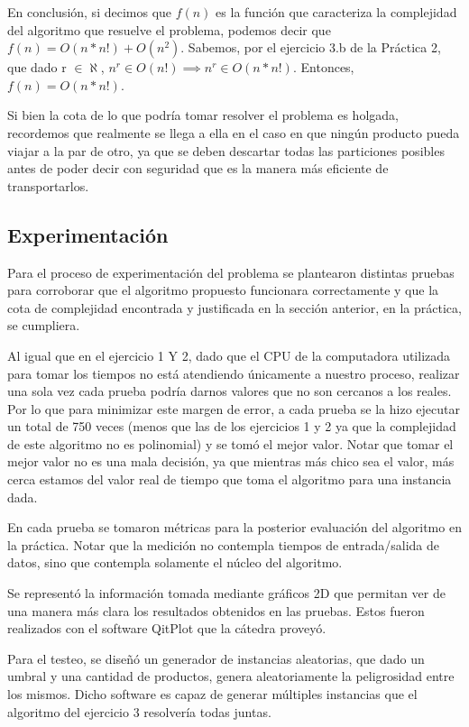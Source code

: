 \documentclass[10pt,a4paper]{article}
\begin{document}
En conclusión, si decimos que $f(n)$ es la función que caracteriza la complejidad del algoritmo que resuelve el problema, podemos decir que $f(n) = O(n*n!) + O(n^2)$. Sabemos, por el ejercicio 3.b de la Práctica 2, que dado r $\in \aleph$, $n^r \in O(n!) \implies n^r \in O(n*n!)$. Entonces, $f(n) = O(n*n!)$.

Si bien la cota de lo que podría tomar resolver el problema es holgada, recordemos que realmente se llega a ella en el caso en que ningún producto pueda viajar a la par de otro, ya que se deben descartar todas las particiones posibles antes de poder decir con seguridad que es la manera más eficiente de transportarlos.

\newpage
\subsection{Experimentación}
Para el proceso de experimentación del problema se plantearon distintas pruebas para corroborar que el algoritmo propuesto funcionara correctamente y que la cota de complejidad encontrada y justificada en la sección anterior, en la práctica, se cumpliera.

Al igual que en el ejercicio 1 Y 2, dado que el CPU de la computadora utilizada para tomar los tiempos no está atendiendo únicamente a nuestro proceso, realizar una sola vez cada prueba podría darnos valores que no son cercanos a los reales. Por lo que para minimizar este margen de error, a cada prueba se la hizo ejecutar un total de 750 veces (menos que las de los ejercicios 1 y 2 ya que la complejidad de este algoritmo no es polinomial) y se tomó el mejor valor. Notar que tomar el mejor valor no es una mala decisión, ya que mientras más chico sea el valor, más cerca estamos del valor real de tiempo que toma el algoritmo para una instancia dada.

En cada prueba se tomaron métricas para la posterior evaluación del algoritmo en la práctica. Notar que la medición no contempla tiempos de entrada/salida de datos, sino que contempla solamente el núcleo del algoritmo.

Se representó la información tomada mediante gráficos 2D que permitan ver de una manera más clara los resultados obtenidos en las pruebas. Estos fueron realizados con el software QitPlot que la cátedra proveyó.

Para el testeo, se diseñó un generador de instancias aleatorias, que dado un umbral y una cantidad de productos, genera aleatoriamente la peligrosidad entre los mismos. Dicho software es capaz de generar múltiples instancias que el algoritmo del ejercicio 3 resolvería todas juntas.
\end{document}
